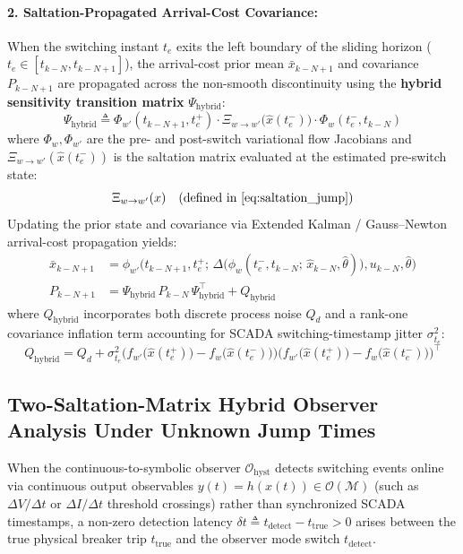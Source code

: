 \documentclass[11pt]{article}
\begin{document}
\paragraph{2. Saltation-Propagated Arrival-Cost Covariance:}
When the switching instant $t_e$ exits the left boundary of the sliding horizon ($t_e \in [t_{k-N}, t_{k-N+1}]$), the arrival-cost prior mean $\bar{x}_{k-N+1}$ and covariance $P_{k-N+1}$ are propagated across the non-smooth discontinuity using the \textbf{hybrid sensitivity transition matrix} $\Psi_{\mathrm{hybrid}}$:
\begin{equation}
\Psi_{\mathrm{hybrid}} \triangleq \Phi_{w'}(t_{k-N+1}, t_e^{+}) \cdot \Xi_{w \to w'}\big(\hat{x}(t_e^{-})\big) \cdot \Phi_w(t_e^{-}, t_{k-N})
\end{equation}
where $\Phi_w, \Phi_{w'}$ are the pre- and post-switch variational flow Jacobians and $\Xi_{w \to w'}(\hat{x}(t_e^{-}))$ is the saltation matrix evaluated at the estimated pre-switch state:
\begin{equation}
\Xi_{w \to w'}(x) \quad \text{(defined in \eqref{eq:saltation_jump})}
\end{equation}
Updating the prior state and covariance via Extended Kalman / Gauss--Newton arrival-cost propagation yields:
\begin{align}
\bar{x}_{k-N+1} &= \phi_{w'}\!\Big(t_{k-N+1}, t_e^{+};\, \Delta\big(\phi_w(t_e^{-}, t_{k-N};\, \hat{x}_{k-N}, \hat{\theta})\big), u_{k-N}, \hat{\theta}\Big) \\
P_{k-N+1} &= \Psi_{\mathrm{hybrid}}\, P_{k-N}\, \Psi_{\mathrm{hybrid}}^{\top} + Q_{\mathrm{hybrid}}
\end{align}
where $Q_{\mathrm{hybrid}}$ incorporates both discrete process noise $Q_d$ and a rank-one covariance inflation term accounting for SCADA switching-timestamp jitter $\sigma_{t_e}^{2}$:
\begin{equation}
Q_{\mathrm{hybrid}} = Q_d + \sigma_{t_e}^{2} \Big( f_{w'}\big(\hat{x}(t_e^{+})\big) - f_w\big(\hat{x}(t_e^{-})\big) \Big)\Big( f_{w'}\big(\hat{x}(t_e^{+})\big) - f_w\big(\hat{x}(t_e^{-})\big) \Big)^{\top}
\end{equation}
\subsection{Two-Saltation-Matrix Hybrid Observer Analysis Under Unknown Jump Times}

When the continuous-to-symbolic observer $\mathcal{O}_{\mathrm{hyst}}$ detects switching events online via continuous output observables $y(t) = h(x(t)) \in \mathcal{O}(\mathcal{M})$ (such as $\Delta V/\Delta t$ or $\Delta I/\Delta t$ threshold crossings) rather than synchronized SCADA timestamps, a non-zero detection latency $\delta t \triangleq t_{\mathrm{detect}} - t_{\mathrm{true}} > 0$ arises between the true physical breaker trip $t_{\mathrm{true}}$ and the observer mode switch $t_{\mathrm{detect}}$.
\end{document}

